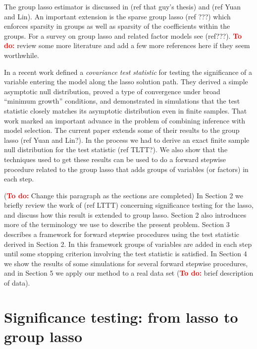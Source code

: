 \documentclass{imsart}
\newcommand{\todo}{\textcolor{red}{\textbf{To do: }}}
\begin{document}

The group lasso estimator is discussed in (ref that guy's thesis) and
(ref Yuan and Lin).  An important extension is the sparse group lasso
(ref ???) which enforces sparsity in groups as well as sparsity of the
coefficients within the groups.  For a survey on group lasso and
related factor models see (ref???). \todo review some more literature
and add a few more references here if they seem worthwhile. 


In a recent work \cite{significance:lasso} defined a \emph{covariance
  test statistic} for testing the significance of a variable entering
the model along the lasso solution path.  They derived a simple
asymptotic null distribution, proved a type of convergence under broad
``minimum growth'' conditions, and demonstrated in simulations that
the test statistic closely matches its asymptotic distribution even in
finite samples.  That work marked an important advance in the problem
of combining inference with model selection.  The current paper
extends some of their results to the group lasso (ref Yuan and Lin?).
In the process we had to derive an exact finite sample null
distribution for the test statistic (ref TLTT?).  We also show that
the techniques used to get these results can be used to do a forward
stepwise procedure related to the group lasso that adds groups of
variables (or factors) in each step. 



(\todo Change this paragraph as the sections are completed)
In Section 2 we briefly review the work of (ref LTTT) concerning
significance testing for the lasso, and discuss how this result is
extended to group lasso. Section 2 also introduces more of the
terminology we use to describe the present problem. Section 3
describes a framework for forward stepwise procedures using the test
statistic derived in Section 2. In this framework groups of variables
are added in each step until some stopping criterion involving the
test statistic is satisfied. In Section 4 we show the results of some
simulations for several forward stepwise procedures, and in Section 5
we apply our method to a real data set (\todo brief description of
data). 


\section{Significance testing: from lasso to group lasso}
\label{sec:testing}
\end{document}
